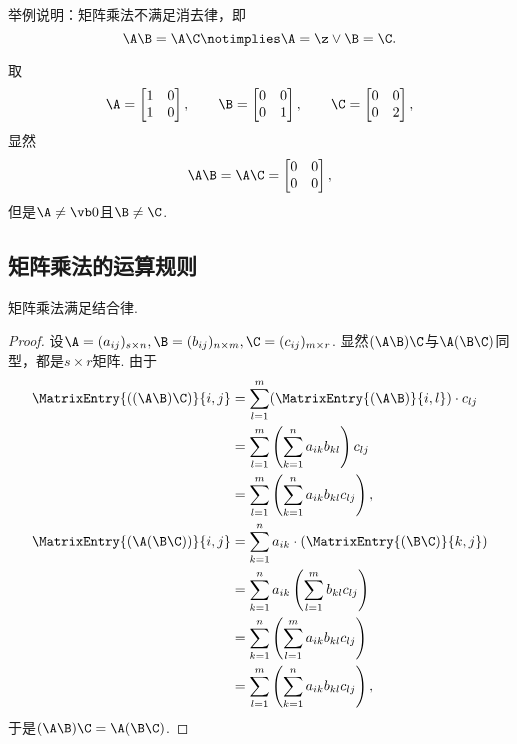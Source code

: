 \begin{example}
举例说明：矩阵乘法不满足消去律，即\[
	\A \B = \A \C
	\notimplies
	\A = \z \lor \B = \C.
\]
\begin{solution}
取\[
	\A = \begin{bmatrix}
		1 & 0 \\
		1 & 0
	\end{bmatrix},
	\qquad
	\B = \begin{bmatrix}
		0 & 0 \\
		0 & 1
	\end{bmatrix},
	\qquad
	\C = \begin{bmatrix}
		0 & 0 \\
		0 & 2
	\end{bmatrix},
\]
显然\[
	\A\B
	= \A\C
	= \begin{bmatrix}
		0 & 0 \\
		0 & 0
	\end{bmatrix},
\]
但是\(\A\neq\vb0\)且\(\B\neq\C\).
\end{solution}
\end{example}

\subsection{矩阵乘法的运算规则}
\begin{theorem}
矩阵乘法满足结合律.
\begin{proof}
设\(\A = (a_{ij})_{s \times n},
\B = (b_{ij})_{n \times m},
\C = (c_{ij})_{m \times r}\).
显然\((\A\B)\C\)与\(\A(\B\C)\)同型，都是\(s \times r\)矩阵.
由于\begin{align*}
	\MatrixEntry{((\A\B)\C)}{i,j}
	&= \sum_{l=1}^m (\MatrixEntry{(\A\B)}{i,l}) \cdot c_{lj} \\
	&= \sum_{l=1}^m \left( \sum_{k=1}^n a_{ik} b_{kl} \right) c_{lj} \\
	&= \sum_{l=1}^m \left( \sum_{k=1}^n a_{ik} b_{kl} c_{lj} \right), \\
	\MatrixEntry{(\A(\B\C))}{i,j}
	&= \sum_{k=1}^n a_{ik} \cdot (\MatrixEntry{(\B\C)}{k,j}) \\
	&= \sum_{k=1}^n a_{ik} \left( \sum_{l=1}^m b_{kl} c_{lj} \right) \\
	&= \sum_{k=1}^n \left( \sum_{l=1}^m a_{ik} b_{kl} c_{lj} \right) \\
	&= \sum_{l=1}^m \left( \sum_{k=1}^n a_{ik} b_{kl} c_{lj} \right),
\end{align*}
于是\((\A\B)\C = \A(\B\C)\).
\end{proof}
\end{theorem}


